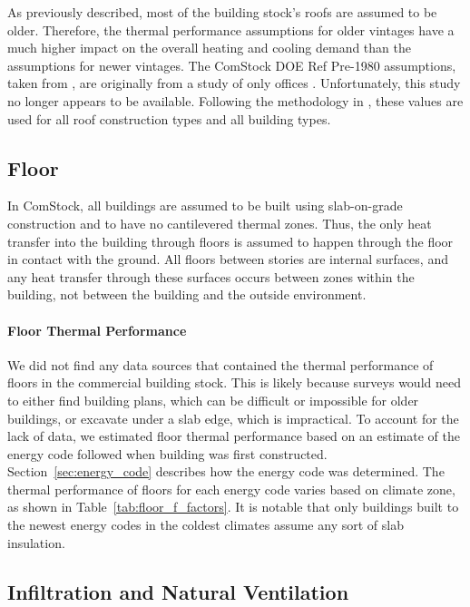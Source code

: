 As previously described, most of the building stock's roofs are assumed to be older. Therefore, the thermal performance assumptions for older vintages have a much higher impact on the overall heating and cooling demand than the assumptions for newer vintages. The ComStock DOE Ref Pre-1980 assumptions, taken from \cite{doe_reference_buildings}, are originally from a study of only offices \citep{old_vintage_office_study}. Unfortunately, this study no longer appears to be available. Following the methodology in \cite{doe_reference_buildings}, these values are used for all roof construction types and all building types.

%

%

\subsection{Floor}
In ComStock, all buildings are assumed to be built using slab-on-grade construction and to have no cantilevered thermal zones. Thus, the only heat transfer into the building through floors is assumed to happen through the floor in contact with the ground. All floors between stories are internal surfaces, and any heat transfer through these surfaces occurs between zones within the building, not between the building and the outside environment.

\paragraph{Floor Thermal Performance}
We did not find any data sources that contained the thermal performance of floors in the commercial building stock. This is likely because surveys would need to either find building plans, which can be difficult or impossible for older buildings, or excavate under a slab edge, which is impractical. To account for the lack of data, we estimated floor thermal performance based on an estimate of the energy code followed when building was first constructed. Section~\ref{sec:energy_code} describes how the energy code was determined. The thermal performance of floors for each energy code varies based on climate zone, as shown in Table~\ref{tab:floor_f_factors}. It is notable that only buildings built to the newest energy codes in the coldest climates assume any sort of slab insulation.

%

\subsection{Infiltration and Natural Ventilation}

